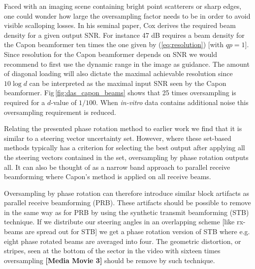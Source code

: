 \documentclass[draftcls]{IEEEtran}
\newcommand\multimedia[1]{\textbf{{\color{red}[#1]}}}
\begin{document}
Faced with an imaging scene containing bright point scatterers or sharp edges, one could wonder how large the oversampling factor needs to be in order to avoid visible scalloping losses. In his seminal paper, Cox \cite{Cox1973} derives the required beam density for a given output SNR. For instance 47 dB requires a beam density for the Capon beamformer ten times the one given by (\ref{eq:resolution}) [with $qp=1$]. Since resolution for the Capon beamformer depends on SNR we would recommend to first use the dynamic range in the image as guidance. The amount of diagonal loading will also dictate the maximal achievable resolution since $10\log{d}$ can be interpreted as the maximal input SNR seen by the Capon beamformer. Fig\,\ref{fig:das_capon_beams} shows that 25 times oversampling is required for a $d$-value of $1/100$. When \textit{in-vitro} data contains additional noise this oversampling requirement is reduced.%

Relating the presented phase rotation method to earlier work we find that it is similar to a steering vector uncertainty set. However, where these set-based methods typically has a criterion for selecting the best output after applying all the steering vectors contained in the set, oversampling by phase rotation outputs all. It can also be thought of as a narrow band approach to parallel receive beamforming where Capon's method is applied on all receive beams.

Oversampling by phase rotation can therefore introduce similar block artifacts as parallel receive beamforming (PRB). These artifacts should be possible to remove in the same way as for PRB by using the synthetic transmit beamforming (STB) technique. If we distribute our steering angles in an overlapping scheme [like rx-beams are spread out for STB] we get a phase rotation version of STB where e.g. eight phase rotated beams are averaged into four. The geometric distortion, or stripes, seen at the bottom of the sector in the video with sixteen times oversampling \multimedia{Media Movie 3} should be remove by such technique.
\end{document}
